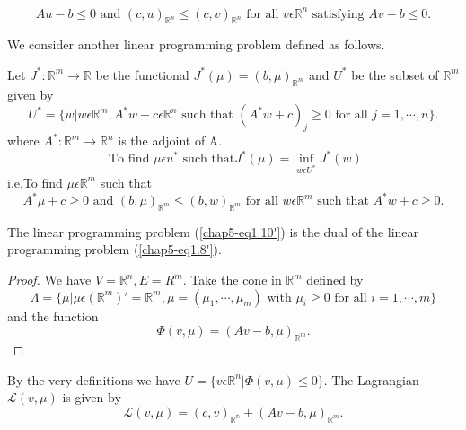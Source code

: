 \begin{equation*}
Au - b \leq 0 \text{ and } (c, u)_{\mathbb{R}^{n}} \leq (c, v)_{\mathbb{R}^{n}} \text{ for all } v \epsilon \mathbb{R}^{n} \text{ satisfying } Av-b \leq 0.\tag*{$(1.8)$}\label{chap5-eq1.8'}
\end{equation*}

We consider another linear programming problem defined as follows.

Let $J^{*} : \mathbb{R}^{m} \to \mathbb{R}$ be the functional $J^{*} (\mu) = (b, \mu)_{\mathbb{R}^{m}}$ and $U^{*}$ be the subset of $\mathbb{R}^{m}$ given by
{\fontsize{10}{12}\selectfont
\begin{equation*}
U^{*} = \{w | w \epsilon \mathbb{R}^{m}, A^{*} w+c \epsilon \mathbb{R}^{n} \text{ such that } (A^{*} w+c)_{j} \geq 0 \text{ for all } j = 1, \cdots, n\}.\tag{1.9}\label{chap5-eq1.9}
\end{equation*}}
where $A^{*} : \mathbb{R}^{m} \to \mathbb{R}^{n}$ is the adjoint of A.
\begin{equation*}
\text{ To find } \mu \epsilon u^{*} \text{ such that} J^{*} (\mu) = \inf_{w \epsilon U^{*}} J^{*} (w)\tag{1.10}\label{chap5-eq1.10}
\end{equation*}
i.e.\qquad To find $\mu \epsilon \mathbb{R}^{m}$ such that
\begin{equation*}
A^{*} \mu + c \geq 0 \text{ and } (b, \mu)_{\mathbb{R}^{m}} \leq (b,w)_{\mathbb{R}^{m}} \text{ for all } w \epsilon \mathbb{R}^{m} \text{ such that } A^{*} w+c \geq 0.\tag*{$(1.10)'$}\label{chap5-eq1.10'}
\end{equation*}

\begin{proposition}\label{chap5-prop1.3}
The linear programming problem (\ref{chap5-eq1.10'}) is the dual of
the linear programming problem (\ref{chap5-eq1.8'}). 
\end{proposition}

\begin{proof}
We have $V = \mathbb{R}^{n}, E = R^{m}$. Take the cone in $\mathbb{R}^{m}$ defined by
$$
\Lambda = \{\mu | \mu \epsilon (\mathbb{R}^{m})' = \mathbb{R}^{m}, \mu = (\mu_{1}, \cdots, \mu_{m}) \text{ with } \mu_{i} \geq 0 \text{ for all } i=1, \cdots, m \} 
$$
and the function
$$
\Phi (v, \mu) = (Av-b, \mu)_{\mathbb{R}^{m}}.
$$
\end{proof}

By the very definitions we have $U = \{v \epsilon \mathbb{R}^{n} | \Phi(v, \mu) \leq 0\}$. The Lagrangian $\mathscr{L} (v, \mu)$ is given by
$$
\mathscr{L} (v, \mu) = (c, v)_{\mathbb{R^{n}}} + (Av - b, \mu)_{\mathbb{R}^{m}}.
$$\pageoriginale

